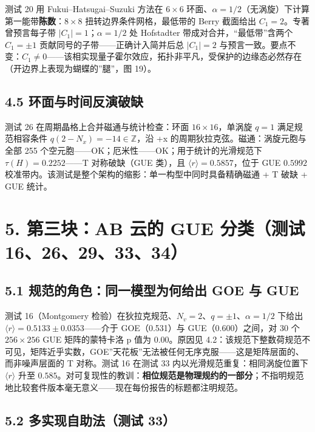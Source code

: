 \documentclass[
]{article}
\begin{document}
测试 20 用 Fukui--Hatsugai--Suzuki 方法在 \(6\times6\)
环面、\(\alpha=1/2\)（无涡旋）下计算第一能带\textbf{陈数}：\(8\times8\)
扭转边界条件网格，最低带的 Berry 截面给出 \(C_1 = 2\)。专著曾预言每子带
\(|C_1|=1\)；\(\alpha=1/2\) 处 Hofstadter 带成对合并，``最低带''含两个
\(C_1=\pm1\) 贡献同号的子带------正确计入简并后总 \(|C_1|=2\)
与预言一致。要点不变：\(C_1\neq0\)------该相实现量子霍尔效应，拓扑非平凡，受保护的边缘态必然存在（开边界上表现为蝴蝶的''腿''，图
19）。

\subsection{4.5
环面与时间反演破缺}\label{ux73afux9762ux4e0eux65f6ux95f4ux53cdux6f14ux7834ux7f3a}

测试 26 在周期晶格上合并磁通与统计检查：环面 \(16\times16\)，单涡旋
\(q=1\) 满足规范相容条件 \(q(2-N_x) = -14\in\mathbb{Z}\)，沿 +x
的周期狄拉克弦。磁通：涡旋元胞与全部 255
个空元胞------OK；厄米性------OK；用于统计的光滑规范下
\(\tau(H) = 0.2252\)------T 对称破缺（GUE 类），且
\(\langle r\rangle = 0.5857\)，位于 GUE \(0.5992\)
校准带内。该测试是整个架构的缩影：单一构型中同时具备精确磁通 + T 破缺 +
GUE 统计。

\section{5. 第三块：AB 云的 GUE 分类（测试
16、26、29、33、34）}\label{ux7b2cux4e09ux5757ab-ux4e91ux7684-gue-ux5206ux7c7bux6d4bux8bd5-1626293334}

\subsection{5.1 规范的角色：同一模型为何给出 GOE 与
GUE}\label{ux89c4ux8303ux7684ux89d2ux8272ux540cux4e00ux6a21ux578bux4e3aux4f55ux7ed9ux51fa-goe-ux4e0e-gue}

测试 16（Montgomery
检验）在狄拉克规范、\(N_v=2\)、\(q=\pm1\)、\(\alpha=1/2\) 下给出
\(\langle r\rangle = 0.5133\pm0.0353\)------介于 GOE（0.531）与
GUE（0.600）之间，对 30 个 \(256\times256\) GUE 矩阵的蒙特卡洛 p 值为
\(0.00\)。原因见
4.2：该规范下整数荷规范不可见，矩阵近乎实数，GOE''天花板''无法被任何无序克服------这是矩阵层面的、而非噪声层面的
T 对称。测试 16 在测试 33 内以光滑规范重复：相同涡旋位置下
\(\langle r\rangle\) 升至
\(0.585\)。对可复现性的教训：\textbf{相位规范是物理规约的一部分}；不指明规范地比较套件版本毫无意义------现在每份报告的标题都注明规范。

\subsection{5.2 多实现自助法（测试
33）}\label{ux591aux5b9eux73b0ux81eaux52a9ux6cd5ux6d4bux8bd5-33}
\end{document}
